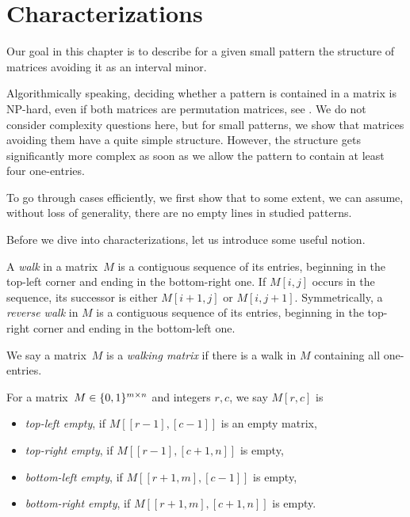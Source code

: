\newsavebox{\smlmat}
\savebox{\smlmat}{$\smm{\bullet&\bullet\\\bullet& }$}
\newsavebox{\smlmatb}
\savebox{\smlmatb}{$\smm{\bullet&\bullet\\\bullet&\bullet}$}
\newsavebox{\smlmatc}
\savebox{\smlmatc}{$\smm{\bullet&\bullet&\bullet\\ &\bullet& }$}

\chapter{Characterizations}
\label{chap:chars}
Our goal in this chapter is to describe for a given small pattern the structure of matrices avoiding it as an interval minor.

Algorithmically speaking, deciding whether a pattern is contained in a matrix is NP-hard, even if both matrices are permutation matrices, see \cite{complex}. We do not consider complexity questions here, but for small patterns, we show that matrices avoiding them have a quite simple structure. However, the structure gets significantly more complex as soon as we allow the pattern to contain at least four one-entries.

To go through cases efficiently, we first show that to some extent, we can assume, without loss of generality, there are no empty lines in studied patterns.

Before we dive into characterizations, let us introduce some useful notion.

\begin{defn}
A \emph{walk} in a matrix~$M$ is a contiguous sequence of its entries, beginning in the top-left corner and ending in the bottom-right one. If $M[i,j]$ occurs in the sequence, its successor is either $M[i+1,j]$ or $M[i,j+1]$. Symmetrically, a \emph{reverse walk} in $M$ is a contiguous sequence of its entries, beginning in the top-right corner and ending in the bottom-left one.
\end{defn}

\begin{defn}
We say a matrix~$M$ is a \emph{walking matrix} if there is a walk in $M$ containing all one-entries.
\end{defn}

\begin{defn}
For a matrix~$M\in\{0,1\}^{m\times n}$ and integers $r,c$, we say $M[r,c]$ is
\begin{itemize}
	\item \emph{top-left empty}, if $M[[r-1],[c-1]]$ is an empty matrix,
	\item \emph{top-right empty}, if $M[[r-1],[c+1,n]]$ is empty,
	\item \emph{bottom-left empty}, if $M[[r+1,m],[c-1]]$ is empty,
	\item \emph{bottom-right empty}, if $M[[r+1,m],[c+1,n]]$ is empty.
\end{itemize}
\end{defn}


